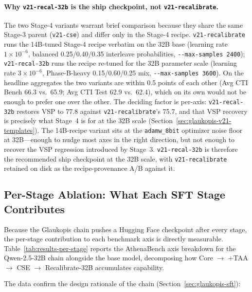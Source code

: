 \documentclass[webpdf,contemporary,large]{oup-authoring-template}
\providecommand{\hfid}[1]{{\small\nolinkurl{#1}}}
\theoremstyle{thmstyleone}
\theoremstyle{thmstyletwo}
\theoremstyle{thmstylethree}
\begin{document}
\paragraph{Why \texorpdfstring{\hfid{v21-recal-32b}}{v21-recal-32b} is the ship checkpoint, not \texorpdfstring{\hfid{v21-recalibrate}}{v21-recalibrate}.}
The two Stage-4 variants warrant brief comparison because they share the same Stage-3 parent (\hfid{v21-cse}) and differ only in the Stage-4 recipe. \hfid{v21-recalibrate} runs the 14B-tuned Stage-4 recipe verbatim on the 32B base (learning rate $1\times 10^{-6}$, balanced 0.25/0.40/0.35 interleave probabilities, \hfid{--max-samples 2400}); \hfid{v21-recal-32b} runs the recipe re-tuned for the 32B parameter scale (learning rate $3\times 10^{-6}$, Phase-B-heavy 0.15/0.60/0.25 mix, \hfid{--max-samples 3600}). On the headline aggregates the two variants are within 0.5 points of each other (Avg CTI Bench 66.3 vs.\ 65.9; Avg CTI Test 62.9 vs.\ 62.4), which on its own would not be enough to prefer one over the other. The deciding factor is per-axis: \hfid{v21-recal-32b} restores VSP to 77.8 against \hfid{v21-recalibrate}'s 75.7, and that VSP recovery is precisely what Stage~4 is for at the 32B scale (Section~\ref{sec:glaukopis-v21-templates}). The 14B-recipe variant sits at the \hfid{adamw_8bit} optimizer noise floor at 32B---enough to nudge most axes in the right direction, but not enough to recover the VSP regression introduced by Stage~3. \hfid{v21-recal-32b} is therefore the recommended ship checkpoint at the 32B scale, with \hfid{v21-recalibrate} retained on disk as the recipe-provenance A/B against it.

\subsection{Per-Stage Ablation: What Each SFT Stage Contributes}
\label{sec:results-per-stage}

Because the Glaukopis chain pushes a Hugging Face checkpoint after every stage, the per-stage contribution to each benchmark axis is directly measurable. Table~\ref{tab:results-per-stage} reports the AthenaBench axis breakdown for the Qwen-2.5-32B chain alongside the base model, decomposing how Core $\to$ +TAA $\to$ CSE $\to$ Recalibrate-32B accumulates capability.

The data confirm the design rationale of the chain (Section~\ref{sec:glaukopis-sft}):
\end{document}
